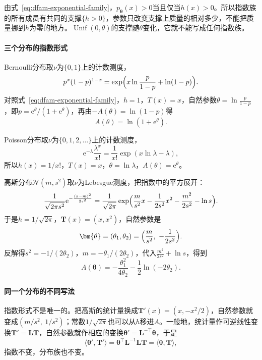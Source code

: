 由式~\eqref{eq:dfam-exponential-family}，$p_{\bm{\theta}}(x)>0$当且仅当$h(x)>0$。所以指数族的所有成员有共同的支撑$\{h>0\}$，参数只改变支撑上质量的相对多少，不能把质量挪到$h$为零的地方。$\operatorname{Unif}(0,\theta)$的支撑随$\theta$变化，它就不能写成任何指数族。

\paragraph{三个分布的指数形式}
Bernoulli分布取$\nu$为$\{0,1\}$上的计数测度，
\[
  p^{x}(1-p)^{1-x}=\exp\Bigl(x\ln\frac{p}{1-p}+\ln(1-p)\Bigr).
\]
对照式~\eqref{eq:dfam-exponential-family}，$h=1$，$T(x)=x$，自然参数$\theta=\ln\frac{p}{1-p}$，即$p=\mathrm{e}^{\theta}/(1+\mathrm{e}^{\theta})$，再由$-A(\theta)=\ln(1-p)$得
\[
  A(\theta)=\ln(1+\mathrm{e}^{\theta}).
\]

Poisson分布取$\nu$为$\{0,1,2,\dots\}$上的计数测度，
\[
  \mathrm{e}^{-\lambda}\frac{\lambda^{x}}{x!}=\frac{1}{x!}\exp(x\ln\lambda-\lambda),
\]
所以$h(x)=1/x!$，$T(x)=x$，$\theta=\ln\lambda$，$A(\theta)=\mathrm{e}^{\theta}$。

高斯分布$\mathcal{N}(m,s^{2})$取$\nu$为Lebesgue测度，把指数中的平方展开：
\[
  \frac{1}{\sqrt{2\pi s^{2}}}\mathrm{e}^{-\frac{(x-m)^{2}}{2s^{2}}}=\frac{1}{\sqrt{2\pi}}\exp\Bigl(\frac{m}{s^{2}}x-\frac{1}{2s^{2}}x^{2}-\frac{m^{2}}{2s^{2}}-\ln s\Bigr).
\]
于是$h=1/\sqrt{2\pi}$，$\bm{T}(x)=(x,x^{2})$，自然参数是
\begin{equation}
  \bm{\theta}=(\theta_1,\theta_2)=\Bigl(\frac{m}{s^{2}},\ -\frac{1}{2s^{2}}\Bigr).
  \label{eq:dfam-gaussian-natural}
\end{equation}
反解得$s^{2}=-1/(2\theta_2)$，$m=-\theta_1/(2\theta_2)$，代入$\frac{m^{2}}{2s^{2}}+\ln s$，得到
\begin{equation}
  A(\bm{\theta})=-\frac{\theta_1^{2}}{4\theta_2}-\frac12\ln(-2\theta_2).
  \label{eq:dfam-gaussian-log-partition}
\end{equation}

\paragraph{同一个分布的不同写法}
指数形式不是唯一的。把高斯的统计量换成$\bm{T}'(x)=(x,-x^{2}/2)$，自然参数就变成$(m/s^{2},\ 1/s^{2})$；常数$1/\sqrt{2\pi}$也可以从$h$移进$A$。一般地，统计量作可逆线性变换$\bm{T}'=\bm{L}\bm{T}$，自然参数就作相应的变换$\bm{\theta}'=\bm{L}^{-\top}\bm{\theta}$，于是
\[
  \langle\bm{\theta}',\bm{T}'\rangle=\bm{\theta}^{\top}\bm{L}^{-1}\bm{L}\bm{T}=\langle\bm{\theta},\bm{T}\rangle ,
\]
指数不变，分布族也不变。

